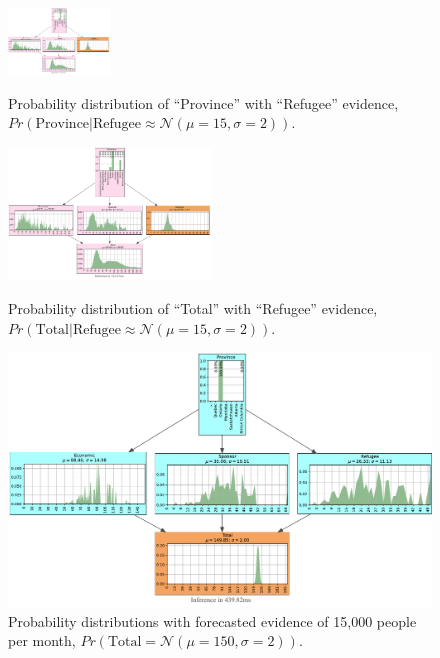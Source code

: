 \documentclass[conference]{IEEEtran}
\begin{document}
	\begin{figure}[!htb]
		\begin{center}
			\includegraphics[clip, trim= 246 238 248 3, width=0.24\textwidth]{fig/inference_refugee_parts.pdf}\\
			\caption{Probability distribution of ``Province'' with ``Refugee'' evidence, $Pr(\text{Province}|\text{Refugee}\approx \mathcal{N}(\mu=15,\sigma=2))$.
			}\label{fig:province_refugee_inference}
		\end{center}
	\end{figure}
	
	\begin{figure}[!htb]
		\begin{center}
			\includegraphics[clip, trim= 195 22 197 274, width=0.48\textwidth]{fig/inference_refugee_parts.pdf}\\
			\caption{Probability distribution of ``Total'' with ``Refugee'' evidence, $Pr(\text{Total}|\text{Refugee}\approx \mathcal{N}(\mu=15,\sigma=2))$.
			}\label{fig:total_refugee_inference}
		\end{center}
	\end{figure}
	
	\begin{figure}[!htb]
		\begin{center}
			\includegraphics[clip, trim= 0 15 0 0, width=\textwidth]{fig/inference_total.pdf}
			\caption{Probability distributions with forecasted evidence of 15,000 people per month, $Pr(\text{Total}=\mathcal{N}(\mu=150,\sigma=2))$.
			}\label{fig:total_inference}
		\end{center}
	\end{figure}
	
\end{document}
